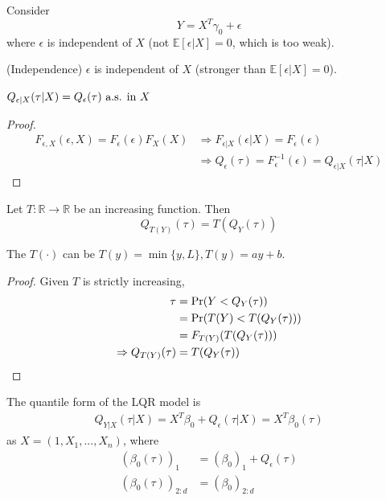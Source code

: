 \documentclass[11pt]{elegantbook}
\begin{document}
Consider $$Y=X^T\gamma_0+\epsilon$$
where $\epsilon$ is independent of $X$ (not $\mathbb{E}[\epsilon|X]=0$, which is too weak).
\begin{assumption} (Independence)
    $\epsilon$ is independent of $X$ (stronger than $\mathbb{E}[\epsilon|X]=0$).
\end{assumption}
\begin{lemma}[By Independence]
    $Q_{\epsilon|X}(\tau|X)=Q_\epsilon(\tau) \textnormal{ a.s. in $X$}$
\end{lemma}
\begin{proof}
    \begin{equation}
        \begin{aligned}
            F_{\epsilon,X}(\epsilon,X)=F_{\epsilon}(\epsilon)F_X(X) &\Rightarrow F_{\epsilon|X}(\epsilon|X)=F_{\epsilon}(\epsilon)\\
            & \Rightarrow Q_{\epsilon}(\tau)=F^{-1}_\epsilon(\epsilon)=Q_{\epsilon|X}(\tau|X)
        \end{aligned}
        \nonumber
    \end{equation}
\end{proof}
\begin{lemma}\label{lemma:equivalence}
    Let $T: \mathbb{R} \rightarrow \mathbb{R}$ be an increasing function. Then $$Q_{T(Y)}(\tau)=T(Q_Y(\tau))$$
\end{lemma}
\begin{example}
    The $T(\cdot)$ can be $T(y)=\min\{y,L\}, T(y)=ay+b$.
\end{example}
\begin{proof}
    Given $T$ is strictly increasing,
    \begin{equation}
        \begin{aligned}
            \tau&=\textnormal{Pr}(Y<Q_Y(\tau))\\
            &=\textnormal{Pr}(T(Y)<T(Q_Y(\tau)))\\
            &=F_{T(Y)}(T(Q_Y(\tau)))\\
            \Rightarrow Q_{T(Y)}(\tau)&=T(Q_Y(\tau))
        \end{aligned}
        \nonumber
    \end{equation}
\end{proof}

The quantile form of the LQR model is
\begin{equation}
    \begin{aligned}
        Q_{Y|X}(\tau|X)=X^T\beta_0+Q_{\epsilon}(\tau|X)=X^T\beta_0(\tau)
    \end{aligned}
    \label{linear_quantile}
\end{equation}
as $X=(1,X_1,...,X_n)$, where
\begin{equation}
    \begin{aligned}
        (\beta_0(\tau))_1&=(\beta_0)_1+Q_\epsilon(\tau)\\
        (\beta_0(\tau))_{2:d}&=(\beta_0)_{2:d}
    \end{aligned}
    \nonumber
\end{equation}
\end{document}
